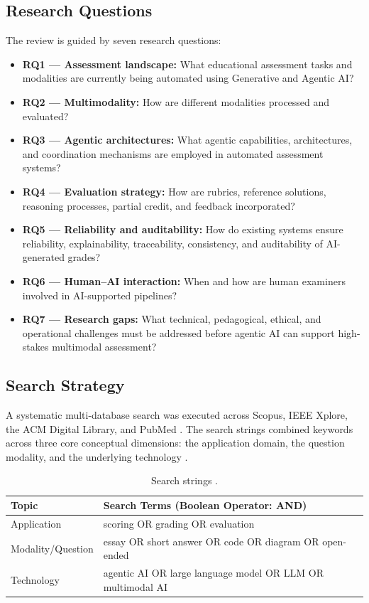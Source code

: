 \documentclass[11pt,a4paper]{article}
\begin{document}
\subsection{Research Questions}
The review is guided by seven research questions:
\begin{itemize}
    \item \textbf{RQ1 — Assessment landscape:} What educational assessment tasks and modalities are currently being automated using Generative and Agentic AI?
    \item \textbf{RQ2 — Multimodality:} How are different modalities processed and evaluated?
    \item \textbf{RQ3 — Agentic architectures:} What agentic capabilities, architectures, and coordination mechanisms are employed in automated assessment systems?
    \item \textbf{RQ4 — Evaluation strategy:} How are rubrics, reference solutions, reasoning processes, partial credit, and feedback incorporated?
    \item \textbf{RQ5 — Reliability and auditability:} How do existing systems ensure reliability, explainability, traceability, consistency, and auditability of AI-generated grades?
    \item \textbf{RQ6 — Human–AI interaction:} When and how are human examiners involved in AI-supported pipelines?
    \item \textbf{RQ7 — Research gaps:} What technical, pedagogical, ethical, and operational challenges must be addressed before agentic AI can support high-stakes multimodal assessment?
\end{itemize}

\subsection{Search Strategy}
A systematic multi-database search was executed across Scopus, IEEE Xplore, the ACM Digital Library, and PubMed \cite{P013}. The search strings combined keywords across three core conceptual dimensions: the application domain, the question modality, and the underlying technology \cite{P013}.

\begin{table}[H]
\centering
\caption{Search strings \cite{P013}.}
\label{tab:search}
\begin{tabularx}{\textwidth}{lX}
\toprule
\textbf{Topic} & \textbf{Search Terms (Boolean Operator: AND)} \\
\midrule
Application & scoring OR grading OR evaluation \\
Modality/Question & essay OR short answer OR code OR diagram OR open-ended \\
Technology & agentic AI OR large language model OR LLM OR multimodal AI \\
\bottomrule
\end{tabularx}
\end{table}
\end{document}
